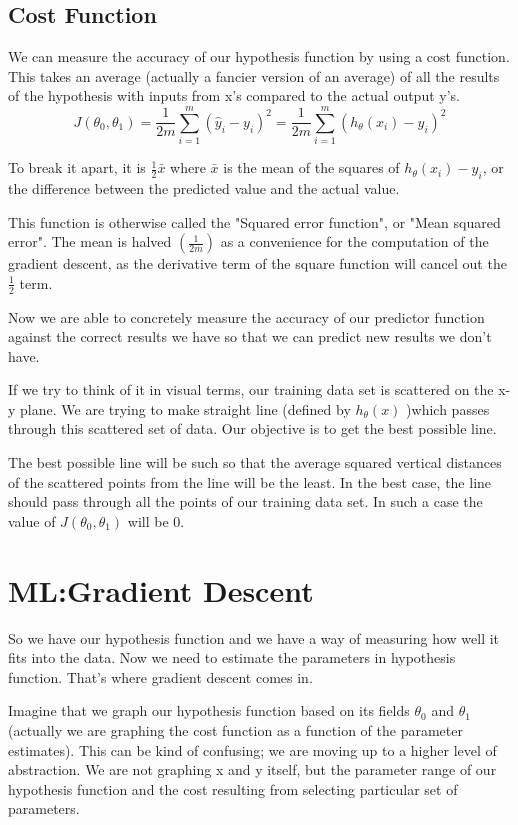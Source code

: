 \documentclass{article}
\begin{document}
\subsection{Cost Function}

We can measure the accuracy of our hypothesis function by using a cost function. This takes an average (actually a fancier version of an average) of all the results of the hypothesis with inputs from x's compared to the actual output y's.
$$J(\theta_0, \theta_1) = \dfrac {1}{2m} \displaystyle \sum _{i=1}^m \left ( \hat{y}_{i}- y_{i} \right)^2  = \dfrac {1}{2m} \displaystyle \sum _{i=1}^m \left (h_\theta (x_{i}) - y_{i} \right)^2$$

To break it apart, it is $\frac{1}{2}\bar{x}$ where $\bar{x}$ is the mean of the squares of $h_\theta (x_{i}) - y_{i}$, or the difference between the predicted value and the actual value.

This function is otherwise called the "Squared error function", or "Mean squared error". The mean is halved $\left(\frac{1}{2m}\right)$ as a convenience for the computation of the gradient descent, as the derivative term of the square function will cancel out the $\frac{1}{2}$ term.

Now we are able to concretely measure the accuracy of our predictor function against the correct results we have so that we can predict new results we don't have.

If we try to think of it in visual terms, our training data set is scattered on the x-y plane. We are trying to make straight line (defined by $h_\theta(x)$ )which passes through this scattered set of data. Our objective is to get the best possible line. 

The best possible line will be such so that the average squared vertical distances of the scattered points from the line will be the least. In the best case, the line should pass through all the points of our training data set. In such a case the value of $J(\theta_0, \theta_1)$ will be 0.
\section{ML:Gradient Descent}
So we have our hypothesis function and we have a way of measuring how well it fits into the data. Now we need to estimate the parameters in hypothesis function. That's where gradient descent comes in.

Imagine that we graph our hypothesis function based on its fields $\theta_0$ and $\theta_1$ (actually we are graphing the cost function as a function of the parameter estimates). This can be kind of confusing; we are moving up to a higher level of abstraction. We are not graphing x and y itself, but the parameter range of our hypothesis function and the cost resulting from selecting particular set of parameters.
\end{document}
